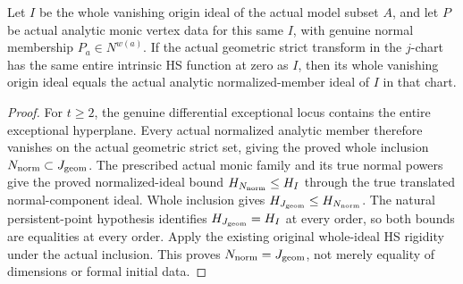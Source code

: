 \begin{theorem}
\label{hir:actual-persistent-normalized-geometric-ideal}
\leanok
Let $I$ be the whole vanishing origin ideal of the actual model subset $A$, and let $P$ be actual analytic monic vertex data for this same $I$, with genuine normal membership $P_a\in N^{w(a)}$.
If the actual geometric strict transform in the $j$-chart has the same entire intrinsic HS function at zero as $I$, then its whole vanishing origin ideal equals the actual analytic normalized-member ideal of $I$ in that chart.
\end{theorem}
\begin{proof}
For $t\ge2$, the genuine differential exceptional locus contains the entire exceptional hyperplane.
Every actual normalized analytic member therefore vanishes on the actual geometric strict set, giving the proved whole inclusion $N_{\rm norm}\subset J_{\rm geom}$.
The prescribed actual monic family and its true normal powers give the proved normalized-ideal bound $H_{N_{\rm norm}}\le H_I$ through the true translated normal-component ideal.
Whole inclusion gives $H_{J_{\rm geom}}\le H_{N_{\rm norm}}$.
The natural persistent-point hypothesis identifies $H_{J_{\rm geom}}=H_I$ at every order, so both bounds are equalities at every order.
Apply the existing original whole-ideal HS rigidity under the actual inclusion. This proves $N_{\rm norm}=J_{\rm geom}$, not merely equality of dimensions or formal initial data.
\end{proof}

